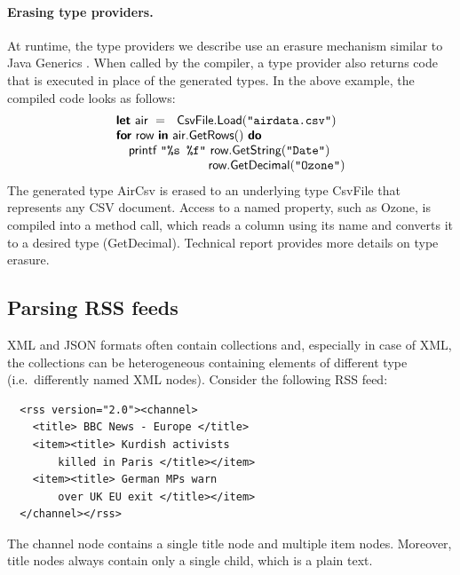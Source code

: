 \documentclass[10pt]{sigplanconf}
\newcommand{\kvd}[1]{\textbf{\sffamily #1}}
\newcommand{\ident}[1]{\textnormal{\sffamily #1}}
\newcommand{\str}[1]{\texttt{#1}}
\begin{document}
\paragraph{Erasing type providers.}
At runtime, the type providers we describe use an erasure mechanism similar to Java Generics 
\cite{types-java-erasure}. When called by the compiler, a type provider also returns code that is 
executed in place of the generated types. In the above example, the compiled code looks as follows:
%
\begin{equation*}
\begin{array}{l}
\kvd{let}~\ident{air}~=~\ident{CsvFile.Load}(\str{"airdata.csv"})\\
\kvd{for}~\ident{row}~\kvd{in}~\ident{air.GetRows}()~\kvd{do}\\
\quad\ident{printf}~\str{"\%s \%f"}~\ident{row.GetString}(\str{"Date"})\\
\quad\quad\quad\quad\quad\quad\quad\;\,\ident{row.GetDecimal}(\str{"Ozone"})\\
\end{array}
\end{equation*}
%
The generated type \ident{AirCsv} is erased to an underlying type \ident{CsvFile}
that represents any CSV document. Access to a named property, such as \ident{Ozone}, is compiled into a 
method call, which reads a column using its name and converts it to a desired
type (\ident{GetDecimal}). Technical report \cite{providers-techreport} provides more details on type erasure.


\subsection{Parsing RSS feeds}
\label{sec:structural-xml}

XML and JSON formats often contain collections and, especially in case of XML, the collections can
be heterogeneous containing elements of different type (i.e.~differently named XML nodes). Consider
the following RSS feed:
%
{\small{
\begin{verbatim}
  <rss version="2.0"><channel>
    <title> BBC News - Europe </title>
    <item><title> Kurdish activists 
        killed in Paris </title></item>
    <item><title> German MPs warn 
        over UK EU exit </title></item>
  </channel></rss>
\end{verbatim}
}}
%
\noindent
The \ident{channel} node contains a single \ident{title} node and multiple \ident{item} nodes.
Moreover, \ident{title} nodes always contain only a single child, which is a plain text.
\end{document}
